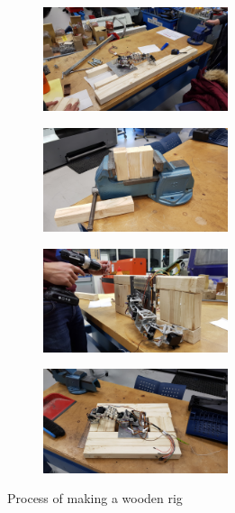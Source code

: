 \documentclass[11pt,a4paper, titlepage]{report}
\begin{document}
	\begin{figure}
	\centering
	
	
	\begin{subfigure}[t]{0.2\textwidth}
		
		\includegraphics[height=1.2in]{../Diagrams/plank1.jpg}
		
		
	\end{subfigure}%
	
	\begin{subfigure}[t]{0.2\textwidth}
		\centering
		\includegraphics[height=1.2in]{../Diagrams/plank2.jpg}
		
	\end{subfigure}%
	
	\begin{subfigure}[t]{0.2\textwidth}
		\includegraphics[height=1.2in]{../Diagrams/plank3.jpg}
		
	\end{subfigure}
	
	\begin{subfigure}[t]{0.2\textwidth}
		\includegraphics[height=1.2in]{../Diagrams/plank4.jpg}
		
	\end{subfigure}
	\caption{Process of making a wooden rig}
	\label{fig:plank-rig}	
	\end{figure}
	
\end{document}
